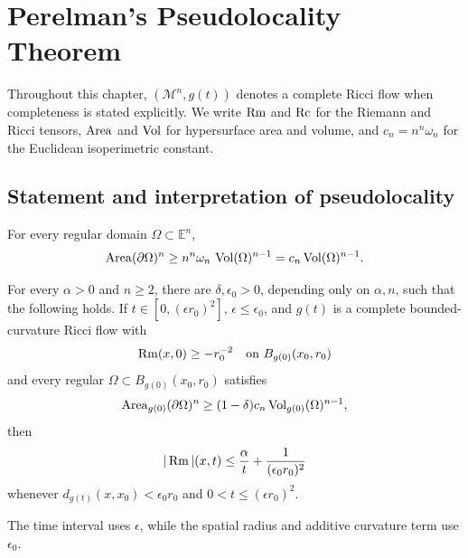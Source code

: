 \chapter{Perelman's Pseudolocality Theorem}
\label{ch:chow-iii-perelmans-pseudolocality}

Throughout this chapter, \((\mathcal M^n,g(t))\) denotes a complete Ricci flow
when completeness is stated explicitly.  We write \(\operatorname{Rm}\) and \(\operatorname{Rc}\) for the
Riemann and Ricci tensors, \(\operatorname{Area}\) and \(\operatorname{Vol}\) for hypersurface area and
volume, and \(c_n=n^n\omega_n\) for the Euclidean isoperimetric constant.

\section{Statement and interpretation of pseudolocality}

\begin{proposition}
\label{prop:chow-iii-euclidean-isoperimetric}
For every regular domain \(\Omega\subset\mathbb E^n\),
\[
  \operatorname{Area}(\partial\Omega)^n\ge n^n\omega_n\,\operatorname{Vol}(\Omega)^{n-1}=c_n\operatorname{Vol}(\Omega)^{n-1}.
\]
\end{proposition}

\begin{theorem}
\label{thm:chow-iii-perelman-pseudolocality}
For every \(\alpha>0\) and \(n\ge2\), there are \(\delta,\epsilon_0>0\),
depending only on \(\alpha,n\), such that the following holds.  If
\(t\in[0,(\epsilon r_0)^2]\), \(\epsilon\le\epsilon_0\), and \(g(t)\) is a
complete bounded-curvature Ricci flow with
\[
\operatorname{Rm}(x,0)\ge-r_0^{-2}\quad\text{on }B_{g(0)}(x_0,r_0)
\]
and every regular \(\Omega\subset B_{g(0)}(x_0,r_0)\) satisfies
\[
\operatorname{Area}_{g(0)}(\partial\Omega)^n\ge(1-\delta)c_n\operatorname{Vol}_{g(0)}(\Omega)^{n-1},
\]
then
\[
|\operatorname{Rm}|(x,t)\le\frac{\alpha}{t}+\frac1{(\epsilon_0r_0)^2}
\]
whenever \(d_{g(t)}(x,x_0)<\epsilon_0r_0\) and
\(0<t\le(\epsilon r_0)^2\).
\end{theorem}

\begin{remark}
\label{rem:chow-iii-pseudolocality-scales}
The time interval uses \(\epsilon\), while the spatial radius and additive
curvature term use \(\epsilon_0\).
\end{remark}

